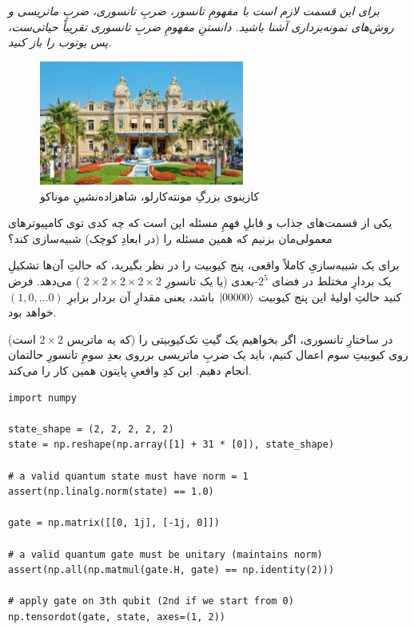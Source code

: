 \documentclass[11pt]{article}
\begin{document}
\begin{center}
\begin{minipage}[H]{0.6\textwidth}
\emph{
برای این قسمت لازم است با مفهومِ تانسور، ضربِ تانسوری، ضربِ ماتریسی و روش‌های نمونه‌برداری آشنا باشید. دانستنِ مفهومِ ضربِ تانسوری تقریباً حیاتی‌ست، پس یوتوب را باز کنید.}
\end{minipage}
\end{center}

\begin{figure}[H]
\centering
\includegraphics[width=0.6\textwidth]{res/casino.jpg}
\caption{کازینوی بزرگِ مونته‌کارلو، شاهزاده‌نشینِ موناکو}
\end{figure}

یکی از قسمت‌های جذاب و قابلِ فهمِ مسئله این است که چه کدی توی کامپیوترهای معمولی‌مان بزنیم که همین مسئله را (در ابعادِ کوچک) شبیه‌سازی کند؟

برای یک شبیه‌سازیِ کاملاً واقعی، پنج کیوبیت را در نظر بگیرید، که حالتِ آن‌ها تشکیلِ یک بردارِ مختلط در فضای $2^5$-بعدی (یا یک تانسورِ 
$2\times 2\times 2\times 2\times 2$
) می‌دهد. فرض کنید حالتِ اولیهٔ این پنج کیوبیت 
$\ket{00000}$
باشد، یعنی مقدارِ آن بردار برابرِ
$ (1, 0, \dots 0) $
خواهد بود.

در ساختارِ تانسوری، اگر بخواهیم یک گیتِ تک‌کیوبیتی را (که یه ماتریس 
$2 \times 2$
است) روی کیوبیتِ سوم اعمال کنیم، باید یک ضربِ ماتریسی برروی بعدِ سومِ تانسورِ حالتمان انجام دهیم. این کدِ واقعیِ پایتون همین‌ کار را می‌کند.


        
\begin{latin}
\begin{lstlisting}
import numpy

state_shape = (2, 2, 2, 2, 2)
state = np.reshape(np.array([1] + 31 * [0]), state_shape)

# a valid quantum state must have norm = 1
assert(np.linalg.norm(state) == 1.0)

gate = np.matrix([[0, 1j], [-1j, 0]])

# a valid quantum gate must be unitary (maintains norm)
assert(np.all(np.matmul(gate.H, gate) == np.identity(2)))

# apply gate on 3th qubit (2nd if we start from 0) 
np.tensordot(gate, state, axes=(1, 2))

\end{lstlisting}
\end{latin}
\end{document}
